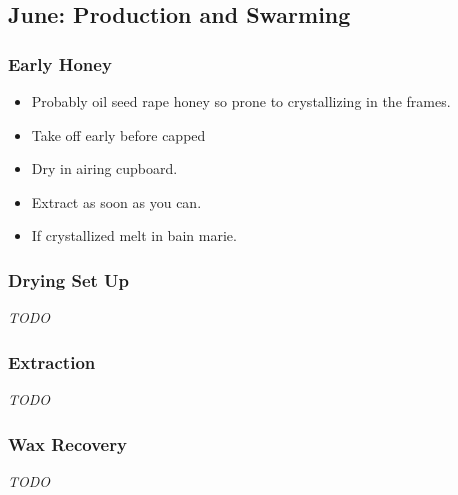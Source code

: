 \subsection{June: Production and Swarming}

\subsubsection{Early Honey}

\begin{itemize}
    \item Probably oil seed rape honey so prone to crystallizing in the frames.
    \item Take off early before capped
    \item Dry in airing cupboard.
    \item Extract as soon as you can.
    \item If crystallized melt in bain marie.
\end{itemize}

\subsubsection{Drying Set Up}

\emph{TODO}

\subsubsection{Extraction}

\emph{TODO}

\subsubsection{Wax Recovery}

\emph{TODO}

